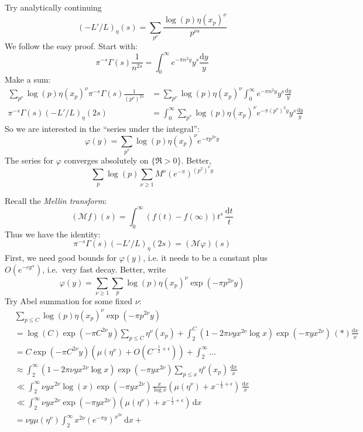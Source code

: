 \documentclass{article}
\newcommand{\cM}{\mathcal{M}}
\newcommand{\dd}{\mathrm{d}}
\theoremstyle{definition}
\begin{document}
Try analytically continuing 
\[
	(-L'/L)_\eta(s) = \sum_{p^\nu} \frac{\log(p)\eta(x_p)^\nu}{p^{\nu s}}
\]
We follow the easy proof. Start with:
\[
	\pi^{-s} \Gamma(s) \frac{1}{n^{2s}} = \int_0^\infty e^{-\pi n^2 y} y^s \frac{\dd y}{y}
\]
Make a sum:
\begin{align*}
	\sum_{p^\nu} \log(p) \eta(x_p)^\nu \pi^{-s} \Gamma(s) \frac{1}{(p^\nu)^{2s}}
		&= \sum_{p^\nu} \log(p) \eta(x_p)^\nu \int_0^\infty e^{-\pi n^2 y} y^s \frac{\dd y}{y} \\
	\pi^{-s} \Gamma(s) (-L'/L)_\eta(2s) 
		&=\int_0^\infty \sum_{p^\nu} \log(p) \eta(x_p)^\nu e^{-\pi (p^\nu)^2 y} y^s \frac{\dd y}{y}
\end{align*}
So we are interested in the ``series under the integral'':
\[
	\varphi(y) = \sum_{p^\nu} \log(p) \eta(x_p)^\nu e^{-\pi p^{2\nu} y} 
\]
The series for $\varphi$ converges absolutely on $\{\Re>0\}$. Better, 
\[
	\sum_p\log(p)\sum_{\nu\geqslant 1}  M^\nu (e^{-\pi})^{(p^2)^\nu y}
\]

Recall the \emph{Mellin transform}:
\[
	(\cM f)(s) = \int_0^\infty (f(t)-f(\infty))t^s\, \frac{\dd t}{t}
\]
Thus we have the identity:
\[
	\pi^{-s} \Gamma(s) (-L'/L)_\eta(2s) = (\cM \varphi)(s)
\]
First, we need good bounds for $\varphi(y)$, i.e. it needs to be a constant 
plus $O(e^{-c y^\alpha})$, i.e.~very fast decay. Better, write 
\[
	\varphi(y) = \sum_{\nu\geqslant 1}\sum_p  \log(p) \eta(x_p)^\nu \exp(-\pi p^{2\nu}y)
\]
Try Abel summation for some fixed $\nu$:
\begin{align*}
	& \sum_{p\leqslant C}\log(p) \eta(x_p)^\nu \exp(-\pi p^{2\nu}y) \\
		&= \log(C)\exp(-\pi C^{2\nu} y) \sum_{p\leqslant C} \eta^\nu(x_p) + \int_2^C (1-2\pi \nu y x^{2\nu}\log x) \exp(-\pi y x^{2\nu})\,(*) \frac{\dd x}{x} \\
		&= C \exp(-\pi C^{2\nu} y) (\mu(\eta^\nu)+O(C^{-\frac 1 2+\epsilon})) + \int_2^\infty \ldots \\
		&\approx \int_2^\infty (1-2\pi \nu y x^{2\nu}\log x) \exp(-\pi y x^{2\nu})\sum_{p\leqslant x} \eta^\nu(x_p)\, \frac{\dd x}{x} \\
		&\ll \int_2^\infty \nu y x^{2\nu}\log(x) \exp(-\pi y x^{2\nu}) \frac{x}{\log x}(\mu(\eta^\nu) + x^{-\frac 1 2+\epsilon})\, \frac{\dd x}{x} \\
		&\ll \int_2^\infty \nu y x^{2\nu} \exp(-\pi y x^{2\nu})(\mu(\eta^\nu)+x^{-\frac 1 2+\epsilon})\, \dd x \\
		&= \nu y \mu(\eta^\nu) \int_2^\infty x^{2\nu} (e^{-\pi y})^{ x^{2\nu}}\, \dd x + 
\end{align*}
\end{document}
